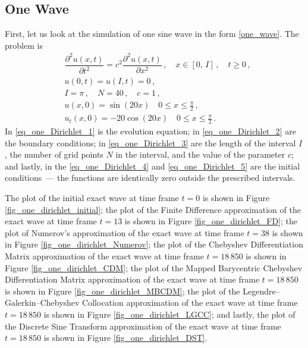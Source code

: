 \documentclass[11pt,a4paper,oneside,openright]{report} %
\begin{document}
\subsection{One Wave}
\noindent
First, let us look at the simulation of one sine wave in the form \eqref{one_wave}. The problem is
\begin{subequations}\label{}
    \begin{align}
        & \dfrac{\partial^2 u (x, t)}{\partial t^2 } = c^2 \dfrac{\partial^2 u (x, t)}{\partial x^2} \, , \quad x \in [0, \, I] \, , \quad t \geq 0 \, , \label{eq_one_Dirichlet_1} \\[5pt]
        & u(0, t) = u(I, t) = 0 \, , \label{eq_one_Dirichlet_2} \\[5pt]
        & I = \pi \, , \quad N = 40 \, , \quad c = 1 \, , \label{eq_one_Dirichlet_3} \\[5pt]
        & u(x,0) = \sin{(20 x)} \quad 0 \leq x \leq \frac{\pi}{2} \, , \label{eq_one_Dirichlet_4} \\[5pt] 
        & u_t(x,0) =  - 20 \cos{(20x)} \quad 0 \leq x \leq \frac{\pi}{2} \, \label{eq_one_Dirichlet_5} .
    \end{align}
\end{subequations}
In \eqref{eq_one_Dirichlet_1} is the evolution equation; in \eqref{eq_one_Dirichlet_2} are the boundary conditions; in \eqref{eq_one_Dirichlet_3} are the length of the interval $I$, the number of grid points $N$ in the interval, and the value of the parameter $c$; and lastly, in the \eqref{eq_one_Dirichlet_4} and \eqref{eq_one_Dirichlet_5} are the initial conditions~— the functions are identically zero outside the prescribed intervals.

The plot of the initial exact wave at time frame $t=0$ is shown in Figure \ref{fig_one_dirichlet_initial}; the plot of the Finite Difference approximation of the exact wave at time frame $t=13$ is shown in Figure \ref{fig_one_dirichlet_FD}; the plot of Numerov's approximation of the exact wave at time frame $t=38$ is shown in Figure \ref{fig_one_dirichlet_Numerov}; the plot of the Chebyshev Differentiation Matrix approximation of the exact wave at time frame $t=18 \,850$ is shown in Figure \ref{fig_one_dirichlet_CDM}; the plot of the Mapped Barycentric Chebyshev Differentiation Matrix approximation of the exact wave at time frame $t=18 \,850$ is shown in Figure \ref{fig_one_dirichlet_MBCDM}; the plot of the Legendre--Galerkin--Chebyshev Collocation approximation of the exact wave at time frame $t=18 \,850$ is shown in Figure \ref{fig_one_dirichlet_LGCC}; and lastly, the plot of the Discrete Sine Transform approximation of the exact wave at time frame $t=18 \,850$ is shown in Figure \ref{fig_one_dirichlet_DST}.
\end{document}
